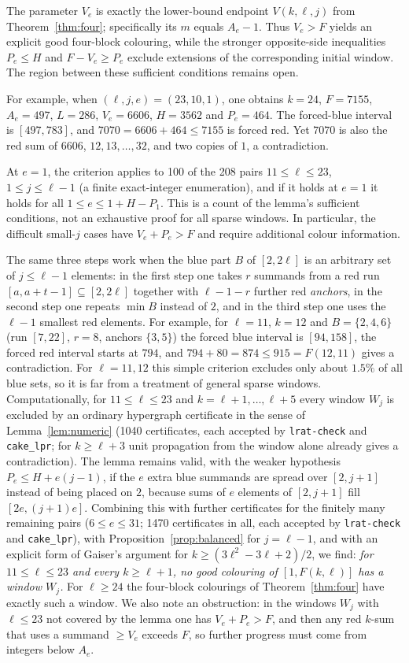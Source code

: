 \documentclass[11pt]{amsart}
\theoremstyle{definition}
\newcommand{\F}{F}
\begin{document}
The parameter $V_e$ is exactly the lower-bound endpoint $V(k,\ell,j)$
from Theorem~\ref{thm:four}; specifically its $m$ equals $A_e-1$.
Thus $V_e>F$ yields an explicit good four-block colouring, while the
stronger opposite-side inequalities $P_e\le H$ and
$F-V_e\ge P_e$ exclude extensions of the corresponding initial window.
The region between these sufficient conditions remains open.

For example, when $(\ell,j,e)=(23,10,1)$, one obtains $k=24$,
$F=7155$, $A_e=497$, $L=286$, $V_e=6606$, $H=3562$ and $P_e=464$.
The forced-blue interval is $[497,783]$, and $7070=6606+464\le7155$
is forced red. Yet $7070$ is also the red sum of $6606$,
$12,13,\ldots,32$, and two copies of $1$, a contradiction.

At $e=1$, the criterion applies to 100 of the 208 pairs
$11\le\ell\le23$, $1\le j\le\ell-1$ (a finite exact-integer
enumeration), and if it holds at $e=1$ it holds for all $1\le e\le 1+H-P_1$. This is a count of the
lemma's sufficient conditions, not an exhaustive proof for all sparse
windows. In particular, the difficult small-$j$ cases have
$V_e+P_e>F$ and require additional colour information.

The same three steps work when the blue part $B$ of $[2,2\ell]$ is an arbitrary set of $j\le\ell-1$ elements: in the first step one takes $r$ summands from a red run $[a,a+t-1]\subseteq[2,2\ell]$ together with $\ell-1-r$ further red \emph{anchors}, in the second step one repeats $\min B$ instead of $2$, and in the third step one uses the $\ell-1$ smallest red elements. For example, for $\ell=11$, $k=12$ and $B=\{2,4,6\}$ (run $[7,22]$, $r=8$, anchors $\{3,5\}$) the forced blue interval is $[94,158]$, the forced red interval starts at $794$, and $794+80=874\le915=\F(12,11)$ gives a contradiction. For $\ell=11,12$ this simple criterion excludes only about $1.5\%$ of all blue sets, so it is far from a treatment of general sparse windows. Computationally, for $11\le\ell\le23$ and $k=\ell+1,\dots,\ell+5$ every window $W_j$ is excluded by an ordinary hypergraph certificate in the sense of Lemma~\ref{lem:numeric} (1040 certificates, each accepted by \texttt{lrat-check} and \texttt{cake\_lpr}; for $k\ge\ell+3$ unit propagation from the window alone already gives a contradiction). The lemma remains valid, with the weaker hypothesis $P_e\le H+e(j-1)$, if the $e$ extra blue summands are spread over $[2,j+1]$ instead of being placed on $2$, because sums of $e$ elements of $[2,j+1]$ fill $[2e,(j+1)e]$. Combining this with further certificates for the finitely many remaining pairs ($6\le e\le31$; 1470 certificates in all, each accepted by \texttt{lrat-check} and \texttt{cake\_lpr}), with Proposition~\ref{prop:balanced} for $j=\ell-1$, and with an explicit form of Gaiser's argument for $k\ge(3\ell^2-3\ell+2)/2$, we find: \emph{for $11\le\ell\le23$ and every $k\ge\ell+1$, no good colouring of $[1,\F(k,\ell)]$ has a window $W_j$.} For $\ell\ge24$ the four-block colourings of Theorem~\ref{thm:four} have exactly such a window. We also note an obstruction: in the windows $W_j$ with $\ell\le23$ not covered by the lemma one has $V_e+P_e>\F$, and then any red $k$-sum that uses a summand $\ge V_e$ exceeds $\F$, so further progress must come from integers below $A_e$.
\end{document}
